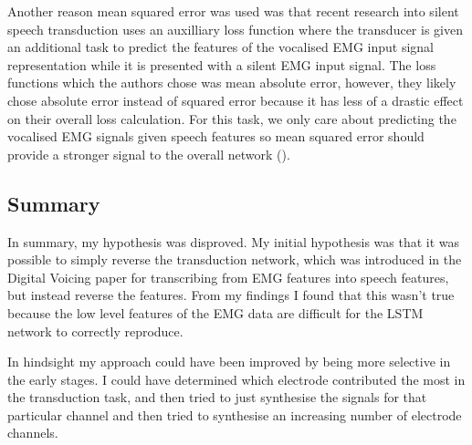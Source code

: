 Another
reason mean squared error was used was that recent research into
silent speech transduction uses an auxilliary loss function where the
transducer is given an additional task to predict the features of
the vocalised EMG input signal representation while it is presented
with a silent EMG input signal. The loss functions which the authors
chose was mean absolute error, however, they likely chose absolute
error instead of squared error because it has less of a drastic
effect on their overall loss calculation. For this task, we only
care about predicting the vocalised EMG signals given speech features
so mean squared error should provide a stronger signal to the overall
network (\cite{silent_speech_tonal}).

\subsection{Summary}

In summary, my hypothesis was disproved.
My initial hypothesis was that it was possible to simply reverse the
transduction network, which was introduced in the Digital Voicing paper
for transcribing from EMG features into speech features, but instead
reverse the features.
From my findings I found that this wasn't true because the low level 
features of the EMG data are difficult for the LSTM network to correctly
reproduce.

In hindsight my approach could have been improved by being more selective in
the early stages. I could have determined which electrode contributed the most
in the transduction task, and then tried to just synthesise the signals for that 
particular channel and then tried to synthesise an increasing number of
electrode channels.